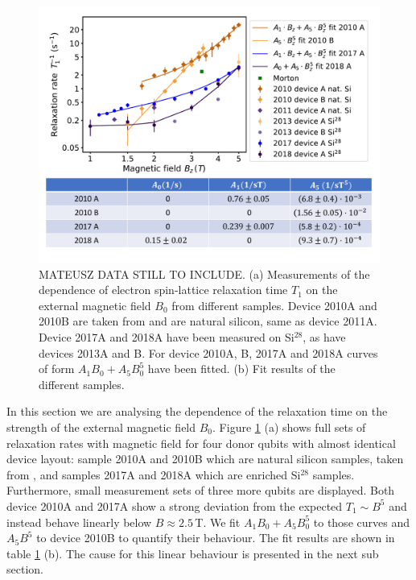 \documentclass[%
 reprint,
 amsmath,amssymb,
 aps,
]{revtex4-1}
\begin{document}
\begin{figure}
\centering
\includegraphics[width=\columnwidth]{fig3.pdf}
\caption{
MATEUSZ DATA STILL TO INCLUDE. (a) Measurements of the dependence of electron spin-lattice relaxation time $T_1$ on the external magnetic field $B_0$ from different samples. Device 2010A and 2010B are taken from \cite{Morello2010} and are natural silicon, same as device 2011A. Device 2017A and 2018A have been measured on Si$^{28}$, as have devices 2013A and B. For device 2010A, B, 2017A and 2018A curves of form $A_1B_0+A_5B_0^5$ have been fitted. (b) Fit results of the different samples. 
}
\label{fig:magnetic field dependence}
\end{figure}


In this section we are analysing the dependence of the relaxation time on the strength of the external magnetic field $B_0$. Figure \ref{fig:magnetic field dependence} (a) shows full sets of relaxation rates with magnetic field for four donor qubits with almost identical device layout: sample 2010A and 2010B which are  natural silicon samples, taken from \cite{Morello2010}, and samples 2017A and 2018A which are enriched Si$^{28}$ samples. Furthermore, small measurement sets of three more qubits are displayed. 
Both device 2010A and 2017A show a strong deviation from the expected $T_1\sim B^5$ and instead behave linearly below $B\approx 2.5\,$T. We fit $A_1B_0+A_5B_0^5$ to those curves and $A_5B^5$ to device 2010B to quantify their behaviour. The fit results are shown in table \ref{fig:magnetic field dependence} (b). The cause for this linear behaviour is presented in the next sub section.
\end{document}
